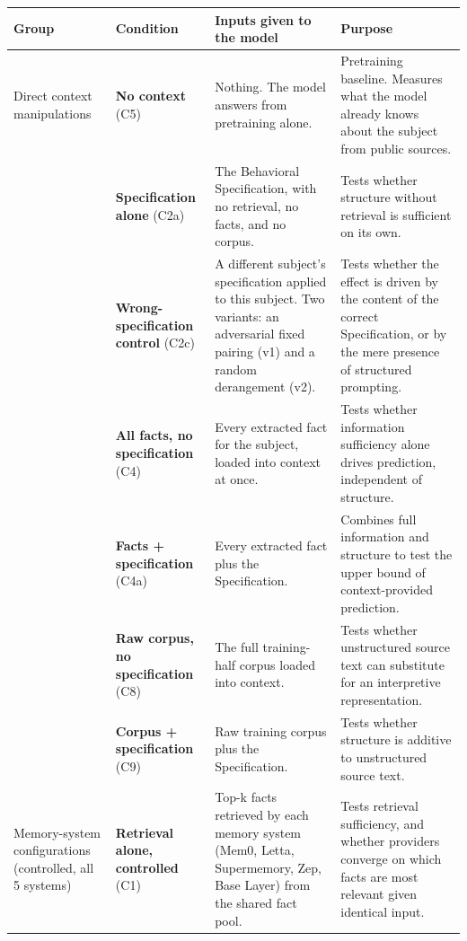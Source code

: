 \begin{longtable}[]{@{}
  >{\raggedright\arraybackslash}p{}
  >{\raggedright\arraybackslash}p{}
  >{\raggedright\arraybackslash}p{}
  >{\raggedright\arraybackslash}p{}@{}}
\toprule
Group & Condition & Inputs given to the model & Purpose \\
\midrule
\endhead
Direct context manipulations & \textbf{No context} (C5) & Nothing. The
model answers from pretraining alone. & Pretraining baseline. Measures
what the model already knows about the subject from public sources. \\
& \textbf{Specification alone} (C2a) & The Behavioral Specification,
with no retrieval, no facts, and no corpus. & Tests whether structure
without retrieval is sufficient on its own. \\
& \textbf{Wrong-specification control} (C2c) & A different subject's
specification applied to this subject. Two variants: an adversarial
fixed pairing (v1) and a random derangement (v2). & Tests whether the
effect is driven by the content of the correct Specification, or by the
mere presence of structured prompting. \\
& \textbf{All facts, no specification} (C4) & Every extracted fact for
the subject, loaded into context at once. & Tests whether information
sufficiency alone drives prediction, independent of structure. \\
& \textbf{Facts + specification} (C4a) & Every extracted fact plus the
Specification. & Combines full information and structure to test the
upper bound of context-provided prediction. \\
& \textbf{Raw corpus, no specification} (C8) & The full training-half
corpus loaded into context. & Tests whether unstructured source text can
substitute for an interpretive representation. \\
& \textbf{Corpus + specification} (C9) & Raw training corpus plus the
Specification. & Tests whether structure is additive to unstructured
source text. \\
Memory-system configurations (controlled, all 5 systems) &
\textbf{Retrieval alone, controlled} (C1) & Top-k facts retrieved by
each memory system (Mem0, Letta, Supermemory, Zep, Base Layer) from the
shared fact pool. & Tests retrieval sufficiency, and whether providers
converge on which facts are most relevant given identical input. \\

\end{longtable}
